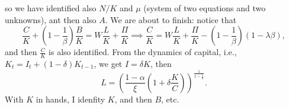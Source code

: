 \documentclass{article}
\begin{document}
	so we have identified also $N/K$ and $\mu$ (system of two equations and two unknowns), ant then also $A$. We are about to finish: notice that
	\begin{equation}
		\frac{C}{K} + \left(1-\frac{1}{\beta}\right) \frac{B}{K} = W\frac{L}{K} + \frac{\Pi}{K} \implies \frac{C}{K} = W\frac{L}{K} + \frac{\Pi}{K} - \left(1-\frac{1}{\beta}\right)\left(1-\lambda\beta\right),
	\end{equation}
	and then $\frac{C}{K}$ is also identified. From the dynamics of capital, i.e., $K_t = I_t + (1-\delta)K_{t-1}$, we get $I = \delta K$, then
	\begin{equation}
		L = \left(\frac{1-\alpha}{\xi}\left(1+\delta\frac{K}{C}\right)\right)^{\frac{1}{1-\frac{1}{\nu}}}.
	\end{equation}
	With $K$ in hands, I idenfity $K$, and then $B$, etc.
\end{document}
